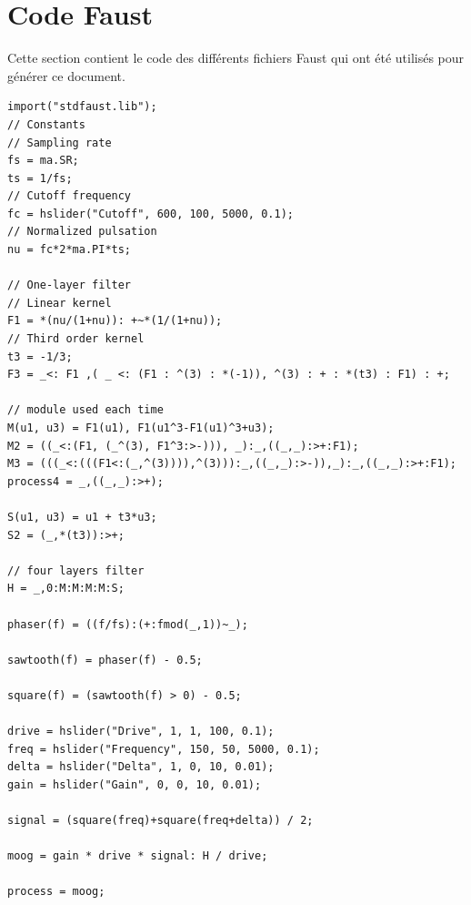 \documentclass{article}
\begin{document}
 \section{Code Faust} \label{listing}  Cette section contient le code des différents fichiers Faust qui ont été utilisés pour générer ce document. 
\bigskip\bigskip
\begin{lstlisting}[caption=\texttt{moog.dsp}]
import("stdfaust.lib");
// Constants
// Sampling rate
fs = ma.SR;
ts = 1/fs;
// Cutoff frequency
fc = hslider("Cutoff", 600, 100, 5000, 0.1);
// Normalized pulsation
nu = fc*2*ma.PI*ts;

// One-layer filter
// Linear kernel
F1 = *(nu/(1+nu)): +~*(1/(1+nu));
// Third order kernel
t3 = -1/3;
F3 = _<: F1 ,( _ <: (F1 : ^(3) : *(-1)), ^(3) : + : *(t3) : F1) : +;

// module used each time 
M(u1, u3) = F1(u1), F1(u1^3-F1(u1)^3+u3);
M2 = ((_<:(F1, (_^(3), F1^3:>-))), _):_,((_,_):>+:F1);
M3 = (((_<:(((F1<:(_,^(3)))),^(3))):_,((_,_):>-)),_):_,((_,_):>+:F1);
process4 = _,((_,_):>+);

S(u1, u3) = u1 + t3*u3;
S2 = (_,*(t3)):>+;

// four layers filter
H = _,0:M:M:M:M:S;

phaser(f) = ((f/fs):(+:fmod(_,1))~_);

sawtooth(f) = phaser(f) - 0.5;

square(f) = (sawtooth(f) > 0) - 0.5;

drive = hslider("Drive", 1, 1, 100, 0.1);
freq = hslider("Frequency", 150, 50, 5000, 0.1);
delta = hslider("Delta", 1, 0, 10, 0.01);
gain = hslider("Gain", 0, 0, 10, 0.01);

signal = (square(freq)+square(freq+delta)) / 2;

moog = gain * drive * signal: H / drive;

process = moog;
\end{lstlisting}
\end{document}

